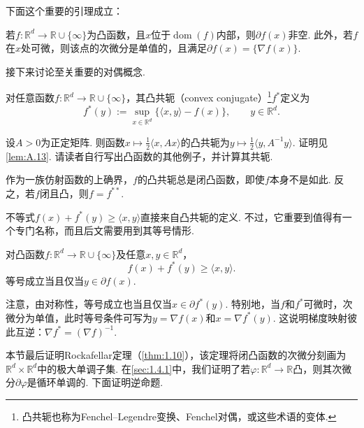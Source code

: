 下面这个重要的引理成立：
\begin{lemma}\label{lem:A.3}
若$f:\mathbb R^d\to\mathbb R\cup\{\infty\}$为凸函数，且$x$位于$\operatorname{dom}(f)$内部，则$\partial f(x)$非空. 此外，若$f$在$x$处可微，则该点的次微分是单值的，且满足$\partial f(x)=\{\nabla f(x)\}$.
\end{lemma}

接下来讨论至关重要的对偶概念.
\begin{definition}[凸共轭]\label{def:A.4}
对任意函数$f:\mathbb R^d\to\mathbb R\cup\{\infty\}$，其凸共轭（convex conjugate）\footnote{凸共轭也称为Fenchel--Legendre变换、Fenchel对偶，或这些术语的变体.}$f^*$定义为
$$
f^*(y):=\sup_{x\in\mathbb R^d}\{\langle x,y\rangle-f(x)\},\qquad y\in\mathbb R^d.
$$
\end{definition}

\begin{example}\label{ex:A.5}
设$A>0$为正定矩阵. 则函数$x\mapsto\frac12\langle x,Ax\rangle$的凸共轭为$y\mapsto\frac12\langle y,A^{-1}y\rangle$. 证明见\autoref{lem:A.13}. 请读者自行写出凸函数的其他例子，并计算其共轭.
\end{example}

作为一族仿射函数的上确界，$f$的凸共轭总是闭凸函数，即使$f$本身不是如此. 反之，若$f$闭且凸，则$f=f^{**}$.

不等式$f(x)+f^*(y)\geq\langle x,y\rangle$直接来自凸共轭的定义. 不过，它重要到值得有一个专门名称，而且后文需要用到其等号情形.

\begin{theorem}\label{thm:A.6}
对凸函数$f:\mathbb R^d\to\mathbb R\cup\{\infty\}$及任意$x,y\in\mathbb R^d$，
$$
f(x)+f^*(y)\geq\langle x,y\rangle.
$$
等号成立当且仅当$y\in\partial f(x)$.
\end{theorem}

注意，由对称性，等号成立也当且仅当$x\in\partial f^*(y)$. 特别地，当$f$和$f^*$可微时，次微分为单值，此时等号条件可写为$y=\nabla f(x)$和$x=\nabla f^*(y)$. 这说明梯度映射彼此互逆：$\nabla f^*=(\nabla f)^{-1}$.

本节最后证明Rockafellar定理（\autoref{thm:1.10}），该定理将闭凸函数的次微分刻画为$\mathbb R^d\times\mathbb R^d$中的极大单调子集. 在\autoref{sec:1.4.1}中，我们证明了若$\varphi:\mathbb R^d\to\mathbb R$凸，则其次微分$\partial\varphi$是循环单调的. 下面证明逆命题.

